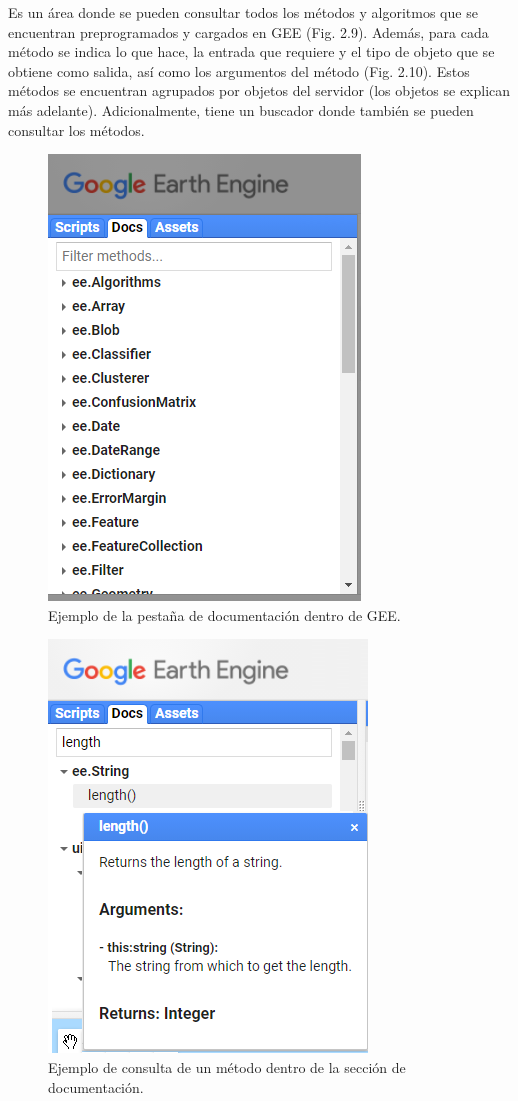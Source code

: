 \documentclass[
  12pt,
  letterpaper,
  twoside]{book}
\begin{document}
Es un área donde se pueden consultar todos los métodos y algoritmos que se encuentran preprogramados y cargados en GEE (Fig. 2.9). Además, para cada método se indica lo que hace, la entrada que requiere y el tipo de objeto que se obtiene como salida, así como los argumentos del método (Fig. 2.10). Estos métodos se encuentran agrupados por objetos del servidor (los objetos se explican más adelante). Adicionalmente, tiene un buscador donde también se pueden consultar los métodos.

\begin{figure}[btp]

{\centering \includegraphics[width=0.4\linewidth]{Img/docs} 

}

\caption{Ejemplo de la pestaña de documentación dentro de GEE.}\label{fig:unnamed-chunk-10}
\end{figure}

\begin{figure}[btp]

{\centering \includegraphics[width=0.4\linewidth]{Img/doc_ejemplo} 

}

\caption{Ejemplo de consulta de un método dentro de la sección de documentación.}\label{fig:unnamed-chunk-11}
\end{figure}
\end{document}
